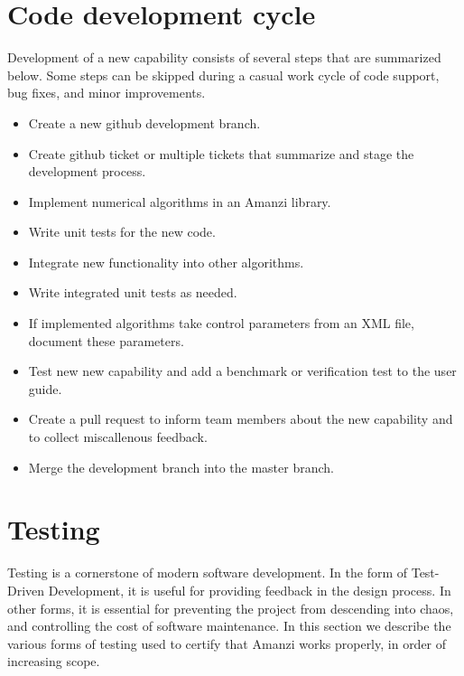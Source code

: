 %
%

\section{Code development cycle}
Development of a new capability consists of several steps that are summarized below.
Some steps can be skipped during a casual work cycle of code support, bug fixes, and minor improvements. 

\begin{itemize}
\item Create a new github development branch.
\item Create github ticket or multiple tickets that summarize and stage the development process.
\item Implement numerical algorithms in an Amanzi library.
\item Write unit tests for the new code.
\item Integrate new functionality into other algorithms.
\item Write integrated unit tests as needed.
\item If implemented algorithms take control parameters from an XML file, 
      document these parameters.
\item Test new new capability and add a benchmark or verification test to the
      user guide.
\item Create a pull request to inform team members about the new capability and 
      to collect miscallenous feedback.
\item Merge the development branch into the master branch.
\end{itemize}
\clearpage



\section{Testing}
Testing is a cornerstone of modern software development. In the form of Test-Driven
Development, it is useful for providing feedback in the design process. In other 
forms, it is essential for preventing the project from descending into chaos, and 
controlling the cost of software maintenance. In this section we describe the 
various forms of testing used to certify that Amanzi works properly, in order of 
increasing scope.

